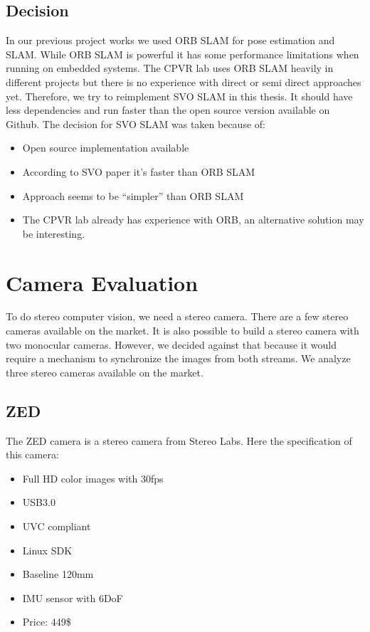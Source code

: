 \documentclass[11pt,a4paper,titlepage,oneside]{report}
\begin{document}
\section{Decision}

In our previous project works we used ORB SLAM for pose estimation and SLAM. While ORB SLAM is powerful it has some performance limitations when running on embedded systems. The CPVR lab uses ORB SLAM heavily in different projects but there is no experience with direct or semi direct approaches yet. Therefore, we try to reimplement SVO SLAM in this thesis. It should have less dependencies and run faster than the open source version available on Github. The decision for SVO SLAM was taken because of:
\begin{itemize}
	\item Open source implementation available
	\item According to SVO paper it's faster than ORB SLAM
	\item Approach seems to be ``simpler'' than ORB SLAM
	\item The CPVR lab already has experience with ORB, an alternative solution may be interesting.
\end{itemize}

\chapter{Camera Evaluation}

To do stereo computer vision, we need a stereo camera. There are a few stereo cameras available on the market. It is also possible to build a stereo camera with two monocular cameras. However, we decided against that because it would require a mechanism to synchronize the images from both streams. We analyze three stereo cameras available on the market.

\section{ZED}
The ZED camera \cite{zed} is a stereo camera from Stereo Labs. Here the specification of this camera:
\begin{itemize}
	\item Full HD color images with 30fps
	\item USB3.0
	\item UVC compliant
	\item Linux SDK
	\item Baseline 120mm
	\item IMU sensor with 6DoF
	\item Price: 449\$
\end{itemize}
\end{document}
